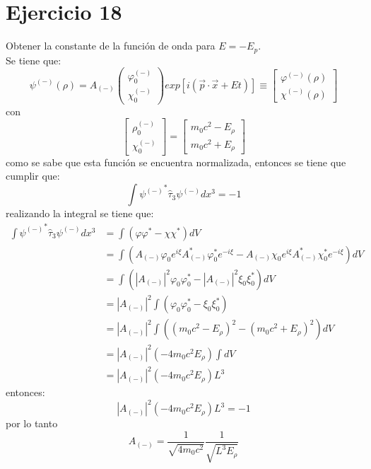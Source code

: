 \section*{Ejercicio 18}
Obtener la constante de la función de onda para $E=-E_p$.\\
Se tiene que:
\begin{equation*}
    \psi^{(-)}(\rho) = A_{(-)}\left(\begin{matrix}
        \varphi_0^{(-)} \\ \chi_{0}^{(-)}
    \end{matrix} \right) exp\left[i\left(\vec{p}\cdot\vec{x}+Et\right)\right] \equiv \left[\begin{matrix}
        \varphi^{(-)}(\rho) \\ \chi^{(-)}(\rho)
    \end{matrix}\right]
\end{equation*}
con 
\begin{equation*}
    \left[\begin{matrix}
        \rho_0^{(-)} \\ \chi_0^{(-)}
    \end{matrix}\right] = \left[\begin{matrix}
        m_0c^2-E_\rho \\ m_0c^2+E_\rho
    \end{matrix}\right]
\end{equation*}
como se sabe que esta función se encuentra normalizada, entonces se tiene que cumplir que:
\begin{equation*}
    \int{\psi^{(-)}}^* \hat{\tau}_3 \psi^{(-)} dx^3 =-1
\end{equation*}
realizando la integral se tiene que:
\begin{align*}
    \int{\psi^{(-)}}^* \hat{\tau}_3 \psi^{(-)} dx^3 &= \int \left(\varphi\varphi^*-\chi\chi^*\right) dV \\
    &=\int \left(A_{(-)}\varphi_0e^{i\xi}A_{(-)}^*\varphi_0^*e^{-i\xi}-A_{(-)}\chi_0e^{i\xi}A_{(-)}^*\chi_0^*e^{-i\xi}\right)dV\\
    &=\int \left(|A_{(-)}|^2 \varphi_0 \varphi_0^* -|A_{(-)}|^2 \xi_0\xi_0^*\right)dV\\
    &=|A_{(-)}|^2 \int \left(\varphi_0 \varphi_0^* -\xi_0\xi_0^*\right)\\
    &=|A_{(-)}|^2  \int \left((m_0c^2-E_\rho)^2-(m_0c^2+E_\rho)^2\right)dV\\
    &=|A_{(-)}|^2 (-4m_0c^2E_\rho) \int dV\\
    &=|A_{(-)}|^2 (-4m_0c^2E_\rho) L^3
\end{align*}
entonces:
\begin{equation*}
    |A_{(-)}|^2 (-4m_0c^2E_\rho) L^3 = -1
\end{equation*}
por lo tanto
\begin{equation*}
    A_{(-)}= \frac{1}{\sqrt{4m_0c^2}} \frac{1}{\sqrt{L^3 E_\rho}}
\end{equation*}
